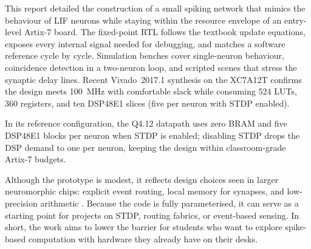 \documentclass[10pt,onecolumn]{IEEEtran}
\begin{document}
This report detailed the construction of a small spiking network that mimics the behaviour of LIF neurons while staying within the resource envelope of an entry-level Artix-7 board. The fixed-point RTL follows the textbook update equations, exposes every internal signal needed for debugging, and matches a software reference cycle by cycle. Simulation benches cover single-neuron behaviour, coincidence detection in a two-neuron loop, and scripted scenes that stress the synaptic delay lines. Recent Vivado~2017.1 synthesis on the XC7A12T confirms the design meets 100~MHz with comfortable slack while consuming 524 LUTs, 360 registers, and ten DSP48E1 slices (five per neuron with STDP enabled).

In its reference configuration, the Q4.12 datapath uses zero BRAM and five DSP48E1 blocks per neuron when STDP is enabled; disabling STDP drops the DSP demand to one per neuron, keeping the design within classroom-grade Artix-7 budgets.

Although the prototype is modest, it reflects design choices seen in larger neuromorphic chips: explicit event routing, local memory for synapses, and low-precision arithmetic \cite{GerstnerKistler2002,Maass1997,IndiveriLiu2015,Furber2014,Merolla2014,Davies2018}. Because the code is fully parameterised, it can serve as a starting point for projects on STDP, routing fabrics, or event-based sensing. In short, the work aims to lower the barrier for students who want to explore spike-based computation with hardware they already have on their desks.
\end{document}
